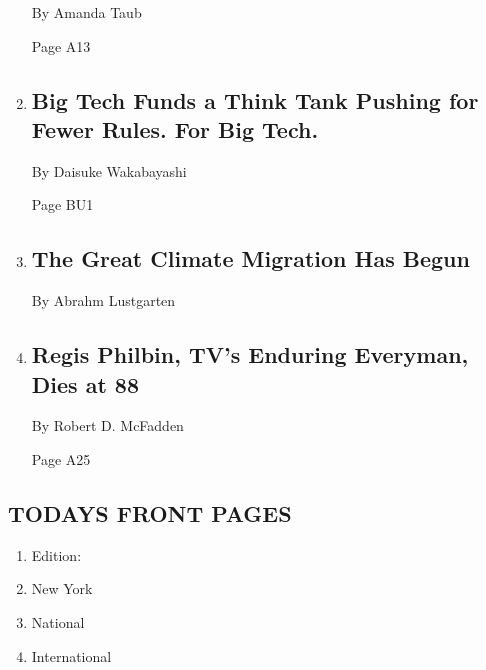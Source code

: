 \begin{enumerate}
  By Amanda Taub

  Page A13
\item
  \href{/2020/07/24/technology/global-antitrust-institute-google-amazon-qualcomm.html}{}

  \hypertarget{big-tech-funds-a-think-tank-pushing-for-fewer-rules-for-big-tech}{%
  \subsection{Big Tech Funds a Think Tank Pushing for Fewer Rules. For
  Big
  Tech.}\label{big-tech-funds-a-think-tank-pushing-for-fewer-rules-for-big-tech}}

  By Daisuke Wakabayashi

  Page BU1
\item
  \href{/interactive/2020/07/23/magazine/climate-migration.html}{}

  \hypertarget{the-great-climate-migration-has-begun}{%
  \subsection{The Great Climate Migration Has
  Begun}\label{the-great-climate-migration-has-begun}}

  By Abrahm Lustgarten
\item
  \href{/2020/07/25/arts/television/regis-philbin-dead.html}{}

  \hypertarget{regis-philbin-tvs-enduring-everyman-dies-at-88}{%
  \subsection{Regis Philbin, TV's Enduring Everyman, Dies at
  88}\label{regis-philbin-tvs-enduring-everyman-dies-at-88}}

  By Robert D. McFadden

  Page A25
\end{enumerate}

\hypertarget{todays-front-pages}{%
\subsection{TODAYS FRONT PAGES}\label{todays-front-pages}}

\begin{enumerate}
\def\labelenumi{\arabic{enumi}.}
\tightlist
\item
  Edition:
\item
  New York
\item
  National
\item
  International
\end{enumerate}

